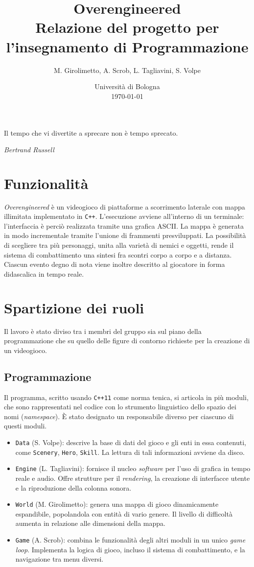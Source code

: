 \documentclass[a4paper]{article}
\title{Overengineered \\
\large Relazione del progetto per l'insegnamento di Programmazione}
\author{
  M. Girolimetto,
  A. Scrob,
  L. Tagliavini,
  S. Volpe
}
\date{
	Universit\`a di Bologna \\
  \today
}
\begin{document}
\maketitle
\thispagestyle{empty}

\epigraph{Il tempo che vi divertite a sprecare non è tempo sprecato.}
{\textit{Bertrand Russell}}

\section{Funzionalit\`a}

\emph{Overengineered} \`e un videogioco di piattaforme a scorrimento laterale
con mappa illimitata implementato in \verb!C++!. L'esecuzione avviene
all'interno di un terminale: l'interfaccia \`e perci\`o realizzata tramite una
grafica ASCII. La mappa \`e generata in modo incrementale tramite l'unione di
frammenti presviluppati. La possibilit\`a di scegliere tra pi\`u personaggi,
unita alla variet\`a di nemici e oggetti, rende il sistema di combattimento una
sintesi fra scontri corpo a corpo e a distanza. Ciascun evento degno di nota
viene inoltre descritto al giocatore in forma didascalica in tempo reale.

\section{Spartizione dei ruoli}

Il lavoro \`e stato diviso tra i membri del gruppo sia sul piano della
programmazione che su quello delle figure di contorno richieste per la creazione
di un videogioco.

\subsection{Programmazione}

Il programma, scritto usando \verb!C++11! come norma tenica, si articola in
pi\`u moduli, che sono rappresentati nel codice con lo strumento linguistico
dello spazio dei nomi (\emph{namespace}). \`E stato designato un responsabile
diverso per ciascuno di questi moduli.
\begin{itemize}
  \item \verb!Data! (S. Volpe): descrive la base di dati del gioco e gli enti in
    essa contenuti, come \verb!Scenery!, \verb!Hero!, \verb!Skill!. La lettura
    di tali informazioni avviene da disco.
  \item \verb!Engine! (L. Tagliavini): fornisce il nucleo \emph{software} per
    l'uso di grafica in tempo reale e audio. Offre strutture per il
    \emph{rendering}, la creazione di interfacce utente e la riproduzione della
    colonna sonora.
  \item \verb!World! (M. Girolimetto): genera una mappa di gioco dinamicamente
    espandibile, popolandola con entit\`a di vario genere. Il livello di
    difficolt\`a aumenta in relazione alle dimensioni della mappa.
  \item \verb!Game! (A. Scrob): combina le funzionalit\`a degli altri moduli in
    un unico \emph{game loop}. Implementa la logica di gioco, incluso il sistema
    di combattimento, e la navigazione tra menu diversi.
\end{itemize}
\end{document}
